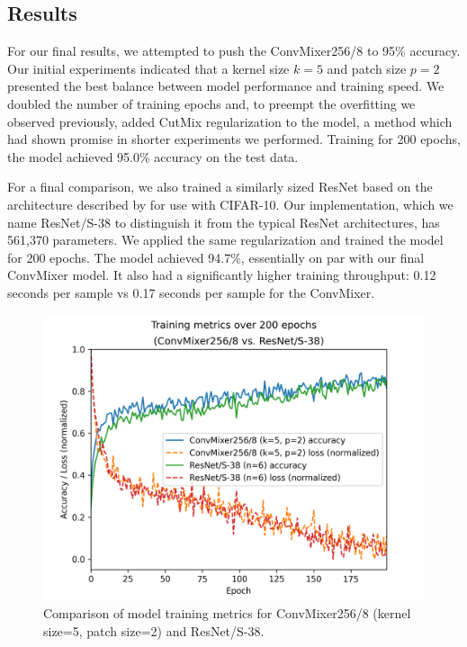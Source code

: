 \documentclass[letterpaper]{article} %
\begin{document}
\subsection{Results}

For our final results, we attempted to push the ConvMixer256/8 to 95\% accuracy. Our initial experiments indicated that a kernel size $k=5$ and patch size $p=2$ presented the best balance between model performance and training speed. We doubled the number of training epochs and, to preempt the overfitting we observed previously, added CutMix regularization \citep{Yun2019} to the model, a method which had shown promise in shorter experiments we performed. Training for 200 epochs, the model achieved 95.0\% accuracy on the test data.

For a final comparison, we also trained a similarly sized ResNet based on the architecture described by \citet{He2015} for use with CIFAR-10. Our implementation, which we name ResNet/S-38 to distinguish it from the typical ResNet architectures, has 561,370 parameters. We applied the same regularization and trained the model for 200 epochs. The model achieved 94.7\%, essentially on par with our final ConvMixer model. It also had a significantly higher training throughput: 0.12 seconds per sample vs 0.17 seconds per sample for the ConvMixer.

\begin{figure}
    \includegraphics[width=\linewidth]{final_training.png}
    \caption{Comparison of model training metrics for ConvMixer256/8 (kernel size=5, patch size=2) and ResNet/S-38.}
  \end{figure}
\end{document}
